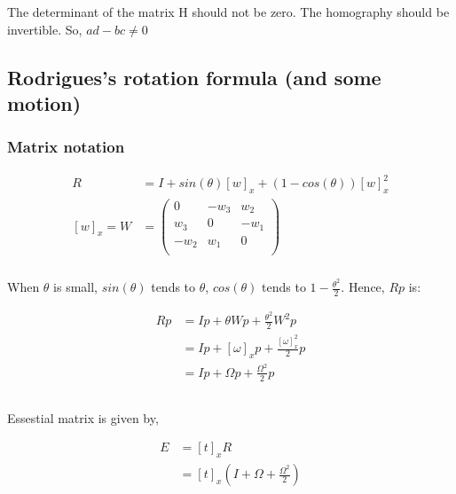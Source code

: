 \documentclass{article}
\begin{document}
\subsubsection{}
The determinant of the matrix H should not be zero. The homography should be invertible. So, $ad - bc \neq 0$


\subsection{Rodrigues’s rotation formula (and some motion)}

\subsubsection{Matrix notation}

\begin{align*}
R &= I + sin(\theta) [w]_x  + (1 - cos(\theta)) [w]_x^2 \\
[w]_x = W &= 
\begin{pmatrix}
0 & -w_3 & w_2 \\
w_3 & 0 & -w_1 \\
-w_2 & w_1 & 0 \\
\end{pmatrix}
\end{align*}

\subsubsection{}

When $\theta$ is small, $sin(\theta)$ tends to $\theta$, $cos(\theta)$ tends to $1 - \frac{\theta^2}{2}$. Hence, $Rp$ is:

\begin{align*}
Rp &= I p + \theta W p + \frac{\theta^2}{2} W^2 p \\
&= I p + [\omega]_x p + \frac{[\omega]_x^2}{2}  p \\
&= I p + \Omega p + \frac{\Omega^2}{2} p \\
\end{align*}


\subsubsection{}
Essestial matrix is given by,

\begin{align*}
E &= [t]_x R \\
&= [t]_x ( I + \Omega + \frac{\Omega^2}{2} ) \\
\end{align*}
\end{document}
